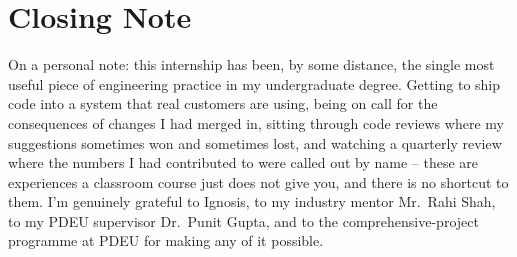 \section{Closing Note}
On a personal note: this internship has been, by some distance, the single most useful piece of engineering practice in my undergraduate degree. Getting to ship code into a system that real customers are using, being on call for the consequences of changes I had merged in, sitting through code reviews where my suggestions sometimes won and sometimes lost, and watching a quarterly review where the numbers I had contributed to were called out by name -- these are experiences a classroom course just does not give you, and there is no shortcut to them. I'm genuinely grateful to Ignosis, to my industry mentor Mr.~Rahi Shah, to my PDEU supervisor Dr.~Punit Gupta, and to the comprehensive-project programme at PDEU for making any of it possible.
